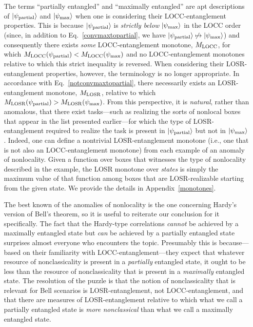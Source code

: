 \documentclass[12pt]{article}
\newcommand{\ket}[1]{\left| #1 \right>}
\theoremstyle{plain}
\theoremstyle{definition}
\begin{document}
The terms ``partially entangled'' and ``maximally entangled'' are apt descriptions of
$\ket{\psi_{\rm partial}}$ and $\ket{\psi_{\rm max}}$ when one is considering their LOCC-entanglement properties.  
This is because $\ket{\psi_{\rm partial}}$ is {\em strictly below} $\ket{\psi_{\rm max}}$ in the LOCC order (since, in addition to Eq.~\eqref{convmaxtopartial}, we have $\ket{\psi_{\rm partial}} \not\mapsto \ket{\psi_{\rm max}}$) and consequently there exists {\em some} 
LOCC-entanglement monotone, $M_{\rm LOCC}$, for which $M_{\rm LOCC}( \psi_{\rm partial} ) < M_{\rm LOCC}( \psi_{\rm max} )$ and no LOCC-entanglement monotones relative to which this strict inequality is reversed.
When considering their LOSR-entanglement properties, however, the terminology is no longer appropriate.
   In accordance with Eq.~\eqref{notconvmaxtopartial}, there necessarily exists an LOSR-entanglement monotone, $M_{\rm LOSR}$, relative to which $M_{\rm LOSR}( \psi_{\rm partial} ) > M_{\rm LOSR}( \psi_{\rm max} )$. 
From this perspective, it is {\em natural}, rather than anomalous, that there exist tasks---such as realizing the sorts of nonlocal boxes that appear in the list presented earlier---for which the type of LOSR-entanglement required to realize the task is present in $|\psi_{\rm partial}\rangle$ but not in $|\psi_{\rm max}\rangle$.  Indeed, one can define a nontrivial
 LOSR-entanglement monotone (i.e., one that is not also an LOCC-entanglement monotone) from each example of an anomaly of nonlocality. Given a function over boxes that witnesses the type of nonlocality described in the example,  the LOSR monotone over {\em states} is simply the maximum value of that function among boxes that are LOSR-realizable starting from the given state. 
We provide the details in Appendix~\ref{monotones}.  



The best known of the anomalies of nonlocality is the one concerning Hardy's version of Bell's theorem, so it is useful to reiterate our conclusion for it specifically.
The fact that the Hardy-type correlations {\em cannot} be achieved by a maximally entangled state but {\em can} be achieved by a partially entangled state surprises almost everyone who encounters the topic.  Presumably this is because---based on their familiarity with LOCC-entanglement---they expect that whatever resource of nonclassicality is present in a {\em partially} entangled state, it ought to be less than 
the resource of nonclassicality that is present in a {\em maximally} entangled state.  The resolution of the puzzle is that the notion of nonclassicality that is relevant for Bell scenarios is LOSR-entanglement, not LOCC-entanglement, and that there are measures of LOSR-entanglement relative to which what we call a partially entangled state is {\em more nonclassical} than what we call a maximally entangled state. 
\end{document}
